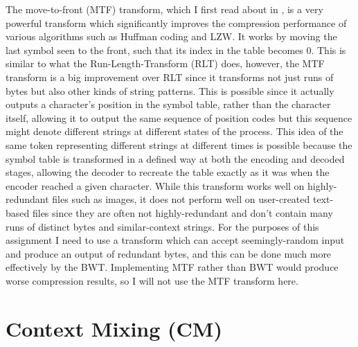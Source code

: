 \documentclass[a4paper, 11pt]{article}
\numberwithin{equation}{section}
\begin{document}
The move-to-front (MTF) transform, which I first read about in \cite{GoogleCompression}, 
is a very powerful transform which significantly improves the compression performance of 
various algorithms such as Huffman coding and LZW. 
It works by moving the last symbol seen to the front, such that its index in the table becomes 0. 
This is similar to what the Run-Length-Transform (RLT) does, however, the MTF transform 
is a big improvement over RLT since it transforms not just runs of bytes but also other kinds of 
string patterns. 
This is possible since it actually outputs a character's position in the symbol table, rather than the 
character itself, allowing it to output the same sequence of position codes but this sequence might denote 
different strings at different states of the process. 
This idea of the same token representing different strings at different times is possible because 
the symbol table is transformed in a defined way at both the encoding and decoded stages, allowing 
the decoder to recreate the table exactly as it was when the encoder reached a given character. 
While this transform works well on highly-redundant files such as images, 
it does not perform well on user-created text-based files since they are often not highly-redundant 
and don't contain many runs of distinct bytes and similar-context strings. 
For the purposes of this assignment I need to use a transform which can accept seemingly-random input 
and produce an output of redundant bytes, and this can be done much more effectively by the BWT. 
Implementing MTF rather than BWT would produce worse compression results, so I will not use the MTF transform here. 


\section{Context Mixing (CM)}
\end{document}
